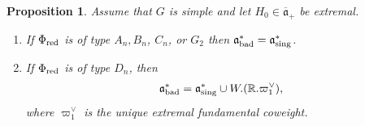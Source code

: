 \documentclass[12pt]{amsart}
\newtheorem{prop}[theorem]{Proposition}
\theoremstyle{remark}
\newcommand{\ga}{\mathfrak a}
\begin{document}

\begin{prop}\label{prop:Weyl-diff}
    Assume that $G$ is simple and let $H_0 \in \overline{\ga}_+$ be extremal.
    \begin{enumerate}
        \item If $\Phi_{\textnormal{red}}$ is of type $A_n, B_n$, $C_n$, or $G_2$ then $\ga^*_{\textnormal{bad}} = \ga^*_{\textnormal{sing}}$.
        \item If $\Phi_{\textnormal{red}}$ is of type $D_n$, then 
        \begin{gather*}
        \ga^*_{\textnormal{bad}} = \ga^*_{\textnormal{sing}} \cup W.(\mathbb{R}. \varpi_1^\vee),
        \end{gather*}
        where $\varpi_1^\vee$ is the unique extremal fundamental coweight. 
    \end{enumerate}
\end{prop}
\end{document}
